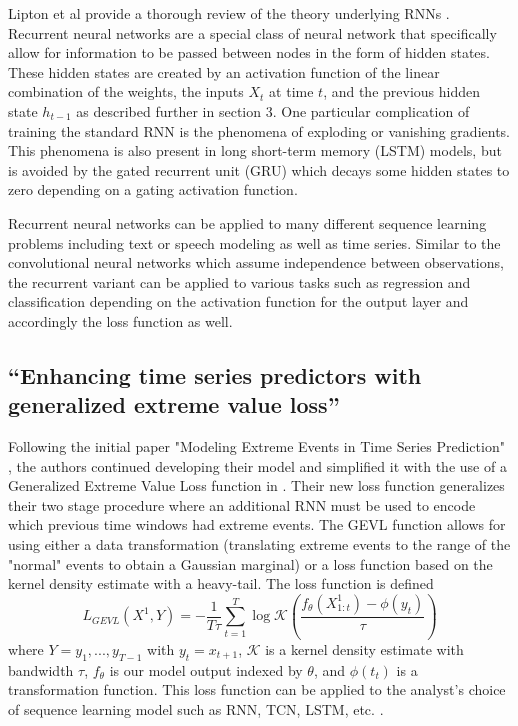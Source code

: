 \documentclass[conference]{IEEEtran}
\begin{document}
Lipton et al provide a thorough review of the theory underlying RNNs \cite{liptonCriticalReviewRecurrent2015}. Recurrent neural networks are a special class of neural network that specifically allow for information to be passed between nodes in the form of hidden states. These hidden states are created by an activation function of the linear combination of the weights, the inputs $X_t$ at time $t$, and the previous hidden state $h_{t-1}$ as described further in section 3. One particular complication of training the standard RNN is the phenomena of exploding or vanishing gradients. This phenomena is also present in long short-term memory (LSTM) models, but is avoided by the gated recurrent unit (GRU) which decays some hidden states to zero depending on a gating activation function. 

Recurrent neural networks can be applied to many different sequence learning problems including text or speech modeling as well as time series. Similar to the convolutional neural networks which assume independence between observations, the recurrent variant can be applied to various tasks such as regression and classification depending on the activation function for the output layer and accordingly the loss function as well. 

\subsection{“Enhancing time series predictors with generalized extreme value loss” \cite{zhangEnhancingTimeSeries2021}}

Following the initial paper "Modeling Extreme Events in Time Series Prediction" \cite{dingModelingExtremeEvents2019}, the authors continued developing their model and simplified it with the use of a Generalized Extreme Value Loss function in \cite{zhangEnhancingTimeSeries2021}. Their new loss function generalizes their two stage procedure where an additional RNN must be used to encode which previous time windows had extreme events. The GEVL function allows for using either a data transformation (translating extreme events to the range of the "normal" events to obtain a Gaussian marginal) or a loss function based on the kernel density estimate with a heavy-tail. The loss function is defined
$$L_{GEVL}(X^1, Y) = -\frac{1}{T \tau} \sum_{t = 1}^T \log \mathcal{K}\left(\frac{f_\theta (X^1_{1:t}) - \phi(y_t)}{\tau}\right)$$
where $Y = {y_1,..., y_{T-1}}$ with $y_t = x_{t+1}$, $\mathcal{K}$ is a kernel density estimate with bandwidth $\tau$, $f_\theta$ is our model output indexed by $\theta$, and $\phi(t_t)$ is a transformation function. This loss function can be applied to the analyst's choice of sequence learning model such as RNN, TCN, LSTM, etc. \cite{zhangEnhancingTimeSeries2021}.
\end{document}
